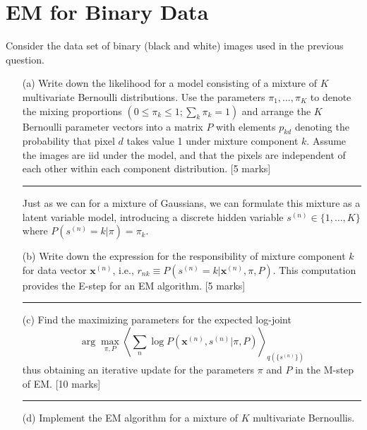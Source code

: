 \documentclass{article}
\begin{document}
\section{EM for Binary Data}

Consider the data set of binary (black and white) images used in the previous question.

\begin{enumerate}
    \item[(a)] Write down the likelihood for a model consisting of a mixture of \( K \) multivariate Bernoulli distributions. Use the parameters \(\pi_1, \dots, \pi_K\) to denote the mixing proportions \((0 \leq \pi_k \leq 1; \sum_k \pi_k = 1)\) and arrange the \(K\) Bernoulli parameter vectors into a matrix \( P \) with elements \( p_{kd} \) denoting the probability that pixel \( d \) takes value 1 under mixture component \( k \). Assume the images are iid under the model, and that the pixels are independent of each other within each component distribution. [5 marks]

    \vspace{10pt}
    \noindent\textcolor{gray}{\rule{0.8\linewidth}{0.4pt}}

    Just as we can for a mixture of Gaussians, we can formulate this mixture as a latent variable model, introducing a discrete hidden variable \( s^{(n)} \in \{1, \dots, K\} \) where \( P(s^{(n)} = k | \pi) = \pi_k \).

    \item[(b)] Write down the expression for the responsibility of mixture component \( k \) for data vector \( \mathbf{x}^{(n)} \), i.e., \( r_{nk} \equiv P(s^{(n)} = k | \mathbf{x}^{(n)}, \pi, P) \). This computation provides the E-step for an EM algorithm. [5 marks]

    \vspace{10pt}
    \noindent\textcolor{gray}{\rule{0.8\linewidth}{0.4pt}}

    \item[(c)] Find the maximizing parameters for the expected log-joint
    \[
    \arg\max_{\pi, P} \left\langle \sum_n \log P(\mathbf{x}^{(n)}, s^{(n)} | \pi, P) \right\rangle_{q(\{s^{(n)}\})}
    \]
    thus obtaining an iterative update for the parameters \(\pi\) and \(P\) in the M-step of EM. [10 marks]

    \vspace{10pt}
    \noindent\textcolor{gray}{\rule{0.8\linewidth}{0.4pt}}

    \item[(d)] Implement the EM algorithm for a mixture of \( K \) multivariate Bernoullis. 


\end{enumerate}
\end{document}
